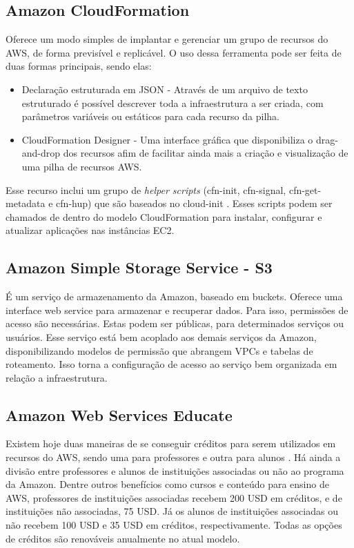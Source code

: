 \documentclass[tg]{mdtufsm}
\begin{document}
\subsection{Amazon CloudFormation}

Oferece um modo simples de implantar e gerenciar um grupo de recursos do AWS, de forma previsível e replicável. O uso dessa ferramenta pode ser feita de duas formas principais, sendo elas:

\begin{itemize}
\item{Declaração estruturada em JSON} - Através de um arquivo de texto estruturado é possível descrever toda a infraestrutura a ser criada, com parâmetros variáveis ou estáticos para cada recurso da pilha.

\item{CloudFormation Designer} - Uma interface gráfica que disponibiliza o drag-and-drop dos recursos afim de facilitar ainda mais a criação e visualização de uma pilha de recursos AWS.
\end{itemize}

Esse recurso inclui um grupo de \emph{helper scripts} (cfn-init, cfn-signal, cfn-get-metadata e cfn-hup) que são baseados no cloud-init \cite{awsinit}. Esses scripts podem ser chamados de dentro do modelo CloudFormation para instalar, configurar e atualizar aplicações nas instâncias EC2.

\subsection{Amazon Simple Storage Service - S3}

É um serviço de armazenamento da Amazon, baseado em buckets. Oferece uma interface web service para armazenar e recuperar dados. Para isso, permissões de acesso são necessárias. Estas podem ser públicas, para determinados serviços ou usuários. Esse serviço está bem acoplado aos demais serviços da Amazon, disponibilizando modelos de permissão que abrangem VPCs e tabelas de roteamento. Isso torna a configuração de acesso ao serviço bem organizada em relação a infraestrutura.

\subsection{Amazon Web Services Educate}

Existem hoje duas maneiras de se conseguir créditos para serem utilizados em recursos do AWS, sendo uma para professores e outra para alunos \cite{awsedu}. Há ainda a divisão entre professores e alunos de instituições associadas ou não ao programa da Amazon. Dentre outros benefícios como cursos e conteúdo para ensino de AWS, professores de instituições associadas recebem 200 USD em créditos, e de instituições não associadas, 75 USD. Já os alunos de instituições associadas ou não recebem 100 USD e 35 USD em créditos, respectivamente. Todas as opções de créditos são renováveis anualmente no atual modelo.
\end{document}
